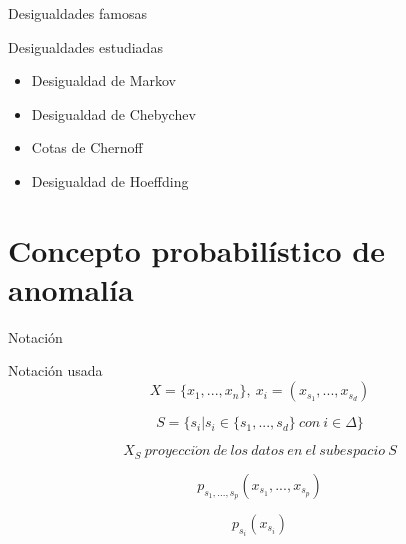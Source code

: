 \documentclass[10pt]{beamer}
\begin{document}
\begin{frame}[fragile]{Desigualdades famosas}
\vspace{10px}
\pause
{}

\begin{block}{Desigualdades estudiadas}
	\begin{itemize}
		\item Desigualdad de Markov
		\item Desigualdad de Chebychev
		\item Cotas de Chernoff
		\item Desigualdad de Hoeffding
	\end{itemize}
\end{block}

\end{frame}

\section{Concepto probabilístico de anomalía}

\begin{frame}[fragile]{Notación}
\vspace{10px}
\pause
{}

\begin{block}{Notación usada}
	$$X = \{ x_1 , ... , x_n \}, \ x_i = (x_{s_1} , ... , x_{s_d})$$
	
	\pause
	
	$$S = \{ s_i | s_i \in \{ s_1 , ... , s_d \} \ con \ i\in \Delta \}$$
	
	\pause
	
	$$X_S \ proyecci\acute{o}n \ de \ los \ datos \ en \ el \ subespacio \ S$$
	
	\pause
	
	$$p_{s_1 , ... , s_p}(x_{s_1} , ... , x_{s_p})$$
	
	\pause
	
	$$p_{s_i}(x_{s_i})$$
\end{block}

\end{frame}
\end{document}

